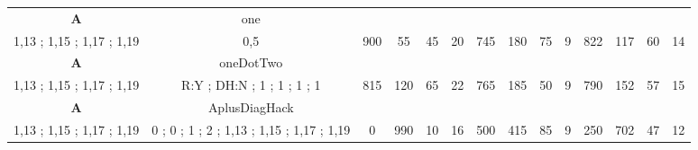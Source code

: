 \begin{table}[H]
{\begin{tabular}{|c|c|c|c|c|c|c|c|c|c|c|c|c|c|}
\cellcolor{blue!15}\textbf{A} & one& {\color[HTML]{00009B} } & {\color[HTML]{9A0000} } & {\color[HTML]{009901} } &  & {\color[HTML]{00009B} } & {\color[HTML]{9A0000} } & {\color[HTML]{009901} } &  & {\color[HTML]{00009B} } & {\color[HTML]{9A0000} } & {\color[HTML]{009901} } &  \\ 
\cellcolor{ blue!15}1,13 ; 1,15 ; 1,17 ; 1,19 & 0,5 & \multirow{-2}{*}{{\color[HTML]{00009B} 900}} & \multirow{-2}{*}{{\color[HTML]{9A0000} 55}} & \multirow{-2}{*}{{\color[HTML]{009901} 45}} & \multirow{-2}{*}{20} & \multirow{-2}{*}{{\color[HTML]{00009B} 745}} & \multirow{-2}{*}{{\color[HTML]{9A0000} 180}} & \multirow{-2}{*}{{\color[HTML]{009901} 75}} & \multirow{-2}{*}{9} & \multirow{-2}{*}{{\color[HTML]{00009B} 822}} & \multirow{-2}{*}{{\color[HTML]{9A0000} 117}} & \multirow{-2}{*}{{\color[HTML]{009901} 60}} & \multirow{-2}{*}{14} \\ \hline

\cellcolor{blue!15}\textbf{A} & oneDotTwo& {\color[HTML]{00009B} } & {\color[HTML]{9A0000} } & {\color[HTML]{009901} } &  & {\color[HTML]{00009B} } & {\color[HTML]{9A0000} } & {\color[HTML]{009901} } &  & {\color[HTML]{00009B} } & {\color[HTML]{9A0000} } & {\color[HTML]{009901} } &  \\ 
\cellcolor{ blue!15}1,13 ; 1,15 ; 1,17 ; 1,19 & R:Y ; DH:N ; 1 ; 1 ; 1 ; 1 & \multirow{-2}{*}{{\color[HTML]{00009B} 815}} & \multirow{-2}{*}{{\color[HTML]{9A0000} 120}} & \multirow{-2}{*}{{\color[HTML]{009901} 65}} & \multirow{-2}{*}{22} & \multirow{-2}{*}{{\color[HTML]{00009B} 765}} & \multirow{-2}{*}{{\color[HTML]{9A0000} 185}} & \multirow{-2}{*}{{\color[HTML]{009901} 50}} & \multirow{-2}{*}{9} & \multirow{-2}{*}{{\color[HTML]{00009B} 790}} & \multirow{-2}{*}{{\color[HTML]{9A0000} 152}} & \multirow{-2}{*}{{\color[HTML]{009901} 57}} & \multirow{-2}{*}{15} \\ \hline

\cellcolor{blue!15}\textbf{A} & AplusDiagHack& {\color[HTML]{00009B} } & {\color[HTML]{9A0000} } & {\color[HTML]{009901} } &  & {\color[HTML]{00009B} } & {\color[HTML]{9A0000} } & {\color[HTML]{009901} } &  & {\color[HTML]{00009B} } & {\color[HTML]{9A0000} } & {\color[HTML]{009901} } &  \\ 
\cellcolor{ blue!15}1,13 ; 1,15 ; 1,17 ; 1,19 & 0 ; 0 ; 1 ; 2 ; 1,13 ; 1,15 ; 1,17 ; 1,19 & \multirow{-2}{*}{{\color[HTML]{00009B} 0}} & \multirow{-2}{*}{{\color[HTML]{9A0000} 990}} & \multirow{-2}{*}{{\color[HTML]{009901} 10}} & \multirow{-2}{*}{16} & \multirow{-2}{*}{{\color[HTML]{00009B} 500}} & \multirow{-2}{*}{{\color[HTML]{9A0000} 415}} & \multirow{-2}{*}{{\color[HTML]{009901} 85}} & \multirow{-2}{*}{9} & \multirow{-2}{*}{{\color[HTML]{00009B} 250}} & \multirow{-2}{*}{{\color[HTML]{9A0000} 702}} & \multirow{-2}{*}{{\color[HTML]{009901} 47}} & \multirow{-2}{*}{12} \\ \hline


\end{tabular}}
\end{table}
